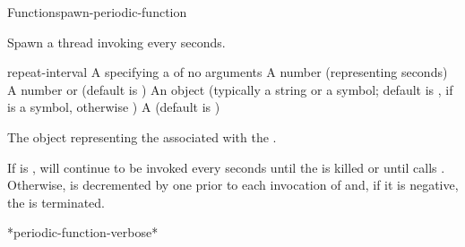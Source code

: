 
\begin{functiondoc}{Function}{spawn-periodic-function}%
  { 
     
    \returns{} }
%
%

\fnsyntax

\fnpurpose Spawn a thread invoking  every
 seconds.

\fnpackage {}

\fnmodule {}

\fnargs
\begin{args}{repeat-interval}
\arg[function] A  specifying a
   of no arguments
 A number (representing seconds)
\arg[count] A number or \nil{} (default is \nil)
\arg[name] An object (typically a string or a symbol; default is
, if  is a symbol, otherwise \nil)
\arg[verbose] A 
  (default is \textbf{})
\end{args}

\fnreturns The object representing the  associated with the
.

\fnerrors
\nothreads{}

\fndescription If  is \nil,  will continue to be
invoked every  seconds until the
  is killed or until 
calls \textbf{}.  Otherwise,  is
decremented by one prior to each invocation of  and, if it is
negative, the  is terminated.

\begin{alsos}{*periodic-function-verbose*}
\end{alsos}


\end{functiondoc}

